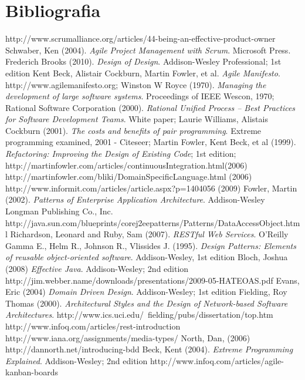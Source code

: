 \section{Bibliografia}

\begin{thebibliography}{30} 

 http://www.scrumalliance.org/articles/44-being-an-effective-product-owner
 Schwaber, Ken (2004). \textit{Agile Project Management with Scrum}. Microsoft Press.
 Frederich Brooks (2010). \textit{Design of Design}. Addison-Wesley Professional; 1st edition
 Kent Beck, Alistair Cockburn, Martin Fowler, et al. \textit{Agile Manifesto}. http://www.agilemanifesto.org;
 Winston W Royce (1970). \textit{Managing the development of large software systems}.
Proceedings of IEEE Wescon, 1970;
 Rational Software Corporation (2000). \textit{Rational Unified Process -- Best Practices for Software Development Teams}. White paper;
 Laurie Williams, Alistais Cockburn (2001). \textit{The costs and benefits of pair programming}. Extreme programming examined, 2001 - Citeseer;
 Martin Fowler, Kent Beck, et al (1999). \textit{Refactoring: Improving the Design of Existing Code}; 1st edition;
 http://martinfowler.com/articles/continuousIntegration.html(2006)
 http://martinfowler.com/bliki/DomainSpecificLanguage.html (2006)
 http://www.informit.com/articles/article.aspx?p=1404056 (2009)
 Fowler, Martin (2002). \textit{Patterns of Enterprise Application Architecture}.  Addison-Wesley Longman Publishing Co., Inc.
 http://java.sun.com/blueprints/corej2eepatterns/Patterns/DataAccessObject.html
 Richardson, Leonard and Ruby, Sam (2007). \textit{RESTful Web Services}. O'Reilly
 Gamma E., Helm R., Johnson R., Vlissides J. (1995). \textit{Design Patterns: Elements of reusable object-oriented software}. Addison-Wesley, 1st edition
 Bloch, Joshua (2008) \textit{Effective Java}. Addison-Wesley; 2nd edition
 http://jim.webber.name/downloads/presentations/2009-05-HATEOAS.pdf
 Evans, Eric (2004) \textit{Domain Driven Design}. Addison-Wesley; 1st edition 
 Fielding, Roy Thomas (2000). \textit{Architectural Styles and the Design of Network-based Software Architectures}. http://www.ics.uci.edu/~fielding/pubs/dissertation/top.htm
 http://www.infoq.com/articles/rest-introduction
 http://www.iana.org/assignments/media-types/
 North, Dan, (2006) http://dannorth.net/introducing-bdd
 Beck, Kent (2004). \textit{Extreme Programming Explained}. Addison-Wesley; 2nd edition
 http://www.infoq.com/articles/agile-kanban-boards

\end{thebibliography}
